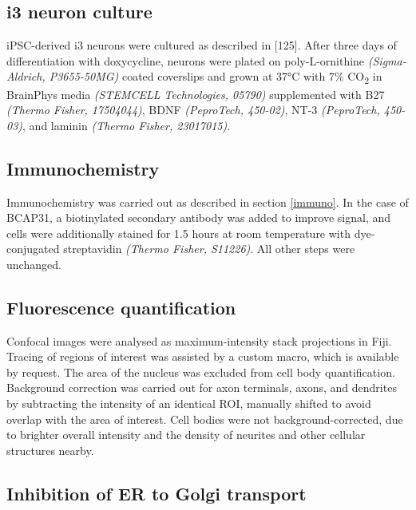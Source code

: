 \documentclass[
  12pt,
  a4paper,
]{book}
\begin{document}
\hypertarget{i3-neuron-culture}{%
\subsection{i3 neuron culture}\label{i3-neuron-culture}}

iPSC-derived i3 neurons were cultured as described in {[}125{]}. After three days of differentiation with doxycycline, neurons were plated on poly-L-ornithine \emph{(Sigma-Aldrich, P3655-50MG)} coated coverslips and grown at 37°C with 7\% CO\textsubscript{2} in BrainPhys media \emph{(STEMCELL Technologies, 05790)} supplemented with B27 \emph{(Thermo Fisher, 17504044)}, BDNF \emph{(PeproTech, 450-02)}, NT-3 \emph{(PeproTech, 450-03)}, and laminin \emph{(Thermo Fisher, 23017015)}.

\hypertarget{immunochemistry}{%
\subsection{Immunochemistry}\label{immunochemistry}}

Immunochemistry was carried out as described in section \ref{immuno}. In the case of BCAP31, a biotinylated secondary antibody was added to improve signal, and cells were additionally stained for 1.5 hours at room temperature with dye-conjugated streptavidin \emph{(Thermo Fisher, S11226)}. All other steps were unchanged.

\hypertarget{fluorescence-quantification}{%
\subsection{Fluorescence quantification}\label{fluorescence-quantification}}

Confocal images were analysed as maximum-intensity stack projections in Fiji. Tracing of regions of interest was assisted by a custom macro, which is available by request. The area of the nucleus was excluded from cell body quantification. Background correction was carried out for axon terminals, axons, and dendrites by subtracting the intensity of an identical ROI, manually shifted to avoid overlap with the area of interest. Cell bodies were not background-corrected, due to brighter overall intensity and the density of neurites and other cellular structures nearby.

\hypertarget{inhibition-of-er-to-golgi-transport}{%
\subsection{Inhibition of ER to Golgi transport}\label{inhibition-of-er-to-golgi-transport}}
\end{document}
